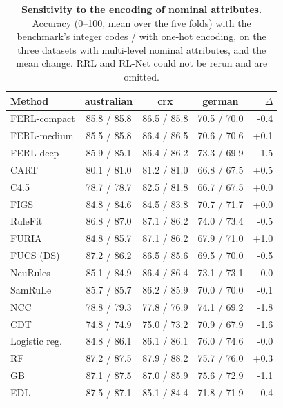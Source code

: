 \begin{table}[t]
\centering
\footnotesize
\setlength{\tabcolsep}{4pt}
\caption{\textbf{Sensitivity to the encoding of nominal attributes.} Accuracy (0--100, mean over the five folds) with the benchmark's integer codes / with one-hot encoding, on the three datasets with multi-level nominal attributes, and the mean change. RRL and RL-Net could not be rerun and are omitted.}
\label{tab:encoding}
\begin{tabular}{@{}lcccr@{}}
\toprule
Method & australian & crx & german & $\Delta$\\
\midrule
FERL-compact & 85.8 / 85.8 & 86.5 / 85.8 & 70.5 / 70.0 & -0.4\\
FERL-medium & 85.5 / 85.8 & 86.4 / 86.5 & 70.6 / 70.6 & +0.1\\
FERL-deep & 85.9 / 85.1 & 86.4 / 86.2 & 73.3 / 69.9 & -1.5\\
CART & 80.1 / 81.0 & 81.2 / 81.0 & 66.8 / 67.5 & +0.5\\
C4.5 & 78.7 / 78.7 & 82.5 / 81.8 & 66.7 / 67.5 & +0.0\\
FIGS & 84.8 / 84.6 & 84.5 / 83.8 & 70.7 / 71.7 & +0.0\\
RuleFit & 86.8 / 87.0 & 87.1 / 86.2 & 74.0 / 73.4 & -0.5\\
FURIA & 84.8 / 85.7 & 87.1 / 86.2 & 67.9 / 71.0 & +1.0\\
FUCS (DS) & 87.2 / 86.2 & 86.5 / 85.6 & 69.5 / 70.0 & -0.5\\
NeuRules & 85.1 / 84.9 & 86.4 / 86.4 & 73.1 / 73.1 & -0.0\\
SamRuLe & 85.7 / 85.7 & 86.2 / 85.9 & 70.0 / 70.0 & -0.1\\
NCC & 78.8 / 79.3 & 77.8 / 76.9 & 74.1 / 69.2 & -1.8\\
CDT & 74.8 / 74.9 & 75.0 / 73.2 & 70.9 / 67.9 & -1.6\\
Logistic reg. & 84.8 / 86.1 & 86.1 / 86.1 & 76.0 / 74.6 & -0.0\\
RF & 87.2 / 87.5 & 87.9 / 88.2 & 75.7 / 76.0 & +0.3\\
GB & 87.1 / 87.5 & 87.0 / 85.9 & 75.6 / 72.9 & -1.1\\
EDL & 87.5 / 87.1 & 85.1 / 84.4 & 71.8 / 71.9 & -0.4\\
\bottomrule
\end{tabular}
\end{table}
